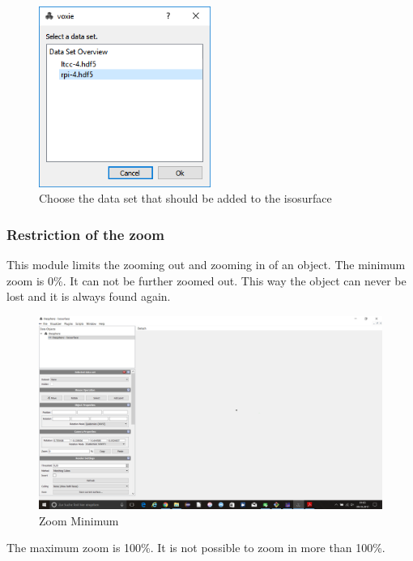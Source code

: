\begin{figure}[h!]
  \centering
  \includegraphics[width=0.5\textwidth]{img/adddataset_dialog.png}
  \caption{Choose the data set that should be added to the isosurface}
\end{figure}

\subsubsection{Restriction of the zoom}\label{restrictionOfTheZoom}

This module limits the zooming out and zooming in of an object.
The minimum zoom is 0\%. It can not be further zoomed out. This way the object can
never be lost and it is always found again.

\begin{figure}[h!]
  \centering
  \includegraphics[width=1.0\textwidth]{img/zoomMinimum.png}
  \caption{Zoom Minimum}
\end{figure}

The maximum zoom is 100\%. It is not possible to zoom in more than 100\%.

